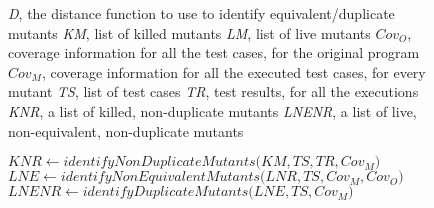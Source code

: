 
\renewcommand{\INDA}{5}
\renewcommand{\INDB}{10}
\renewcommand{\INDC}{15}
\newcommand{\INDD}{20}
\newcommand{\INDE}{25}

\renewcommand{\Comment}[1]{\textcolor{darkgray}{\textit{//#1}}}

\begin{figure}[tb]

\begin{algorithmic}[1]

\scriptsize
\Require \emph{D}, the distance function to use to identify equivalent/duplicate mutants
\Require \emph{KM}, list of killed mutants
\Require \emph{LM}, list of live mutants
\Require $\mathit{Cov}_O$, coverage information for all the test cases, for the original program
\Require $\mathit{Cov}_M$, coverage information for all the executed test cases, for every mutant
\Require \emph{TS}, list of test cases
\Require \emph{TR}, test results, for all the executions
\Ensure \emph{KNR}, a list of killed, non-duplicate  mutants
\Ensure \emph{LNENR}, a list of live, non-equivalent, non-duplicate mutants

\State $\mathit{KNR} \gets \mathit{identifyNonDuplicateMutants(} \mathit{KM}, \mathit{TS}, \mathit{TR}, \mathit{Cov}_M)$ \label{alg:equivalent:KNR}
\State $\mathit{LNE} \gets \mathit{identifyNonEquivalentMutants(} \mathit{LNR}, \mathit{TS}, \mathit{Cov}_M, \mathit{Cov}_O)$ \label{alg:equivalent:LNE}
\State $\mathit{LNENR} \gets \mathit{identifyDuplicateMutants(} \mathit{LNE}, \mathit{TS}, \mathit{Cov}_M)$ \label{alg:equivalent:LNENR}



\end{algorithmic}
\end{figure}

